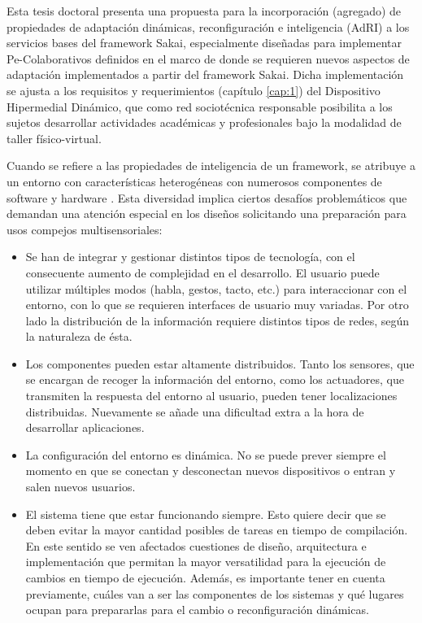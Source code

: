 Esta tesis doctoral presenta una propuesta para la incorporación (agregado) de
propiedades  de adaptación dinámicas, reconfiguración e inteligencia
(AdRI) \label{AdRI} a los servicios bases del framework Sakai,
especialmente diseñadas para implementar Pe-Colaborativos definidos en el marco
de \cite{cacic2007.9} donde se requieren nuevos aspectos de adaptación
\cite{librounq} implementados a partir del framework Sakai. Dicha
implementación se ajusta a los requisitos y requerimientos
(capítulo \ref{cap:1}) del Dispositivo
Hipermedial Dinámico, que como red sociotécnica responsable posibilita a los
sujetos desarrollar actividades académicas y profesionales bajo la modalidad de
taller físico-virtual.  

Cuando se refiere a las propiedades de inteligencia de un framework, se atribuye
a un entorno con características  heterogéneas con numerosos
componentes de software y hardware \cite{cap1.133}. Esta diversidad implica
ciertos desafíos problemáticos que demandan una atención especial en los diseños
solicitando una preparación para usos compejos multisensoriales:

\begin{itemize} 
 
\item
Se han de integrar y gestionar distintos tipos de tecnología, con
el consecuente aumento de complejidad en el desarrollo. El usuario puede
utilizar múltiples modos (habla, gestos, tacto, etc.) para interaccionar con
el entorno, con lo que se requieren interfaces de usuario muy variadas. Por
otro lado la distribución de la información requiere distintos tipos de redes,
según la naturaleza de ésta.

\item
Los componentes pueden estar altamente distribuidos. Tanto los
sensores, que se encargan de recoger la información del entorno, como los
actuadores, que transmiten la respuesta del entorno al usuario, pueden
tener localizaciones distribuidas. Nuevamente se añade una dificultad extra a la
hora de desarrollar aplicaciones.

\item
La configuración del entorno es dinámica. No se puede prever siempre
el momento en que se conectan y desconectan nuevos dispositivos o entran
y salen nuevos usuarios.

\item
El sistema tiene que estar funcionando siempre. Esto quiere decir que se
deben evitar la mayor cantidad posibles de tareas en tiempo de compilación. En
este sentido se ven afectados cuestiones de diseño, arquitectura e
implementación que permitan la mayor versatilidad para la ejecución de
cambios en tiempo de ejecución. Además, es importante tener en cuenta
previamente, cuáles van a ser las componentes de los sistemas y qué lugares
ocupan para prepararlas para el cambio o reconfiguración dinámicas. 

\end{itemize}

